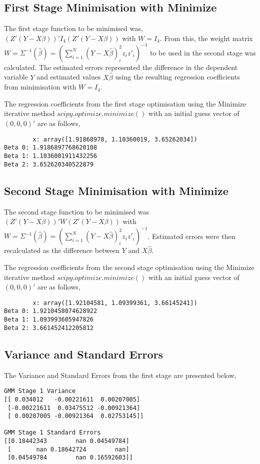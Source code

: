 \documentclass{article}
\begin{document}
\subsection{First Stage Minimisation with Minimize}
The first stage function to be minimised was, $(Z'(Y-X\beta))'I_{4}(Z'(Y-X\beta))$ with $W=I_4$. From this, the weight matrix $W=\Sigma^{-1}(\hat{\beta})=(\sum \limits_{i=1}^N (Y-X\hat{\beta})_i^{2} z_i z'_i)^{-1}$ to be used in the second stage was calculated. The estimated errors represented the difference in the dependent variable $Y$ and estimated values $X\hat{\beta}$ using the resulting regression coefficients from minimisation with $W=I_4$.

The regression coefficients from the first stage optimisation using the Minimize iterative method $scipy.optimize.minimize()$ with an initial guess vector of $(0, 0, 0)'$ are as follows,

\begin{lstlisting}
        x: array([1.91868978, 1.10360019, 3.65262034])
Beta 0: 1.9186897768620108
Beta 1: 1.1036001911432256
Beta 2: 3.652620340522879
\end{lstlisting}

\subsection{Second Stage Minimisation with Minimize}
The second stage function to be minimised was $(Z'(Y-X\beta))'W(Z'(Y-X\beta))$ with $W=\Sigma^{-1}(\hat{\beta})=(\sum \limits_{i=1}^N (Y-X\hat{\beta})_i^{2} z_i z'_i)^{-1}$. Estimated errors were then recalculated as the difference between $Y$ and $X\hat{\beta}$.

The regression coefficients from the second stage optimisation using the Minimize iterative method $scipy.optimize.minimize()$ with an initial guess vector of $(0, 0, 0)'$ are as follows,

\begin{lstlisting}
        x: array([1.92104581, 1.09399361, 3.66145241])
Beta 0: 1.9210458074628922
Beta 1: 1.093993605947826
Beta 2: 3.661452412205812
\end{lstlisting}

\break
\subsection{Variance and Standard Errors}
The Variance and Standard Errors from the first stage are presented below,

\begin{lstlisting}
GMM Stage 1 Variance
[[ 0.034012   -0.00221611  0.00207005]
 [-0.00221611  0.03475512 -0.00921364]
 [ 0.00207005 -0.00921364  0.02753145]]

GMM Stage 1 Standard Errors
[[0.18442343        nan 0.04549784]
 [       nan 0.18642724        nan]
 [0.04549784        nan 0.16592603]]
\end{lstlisting}
\end{document}
